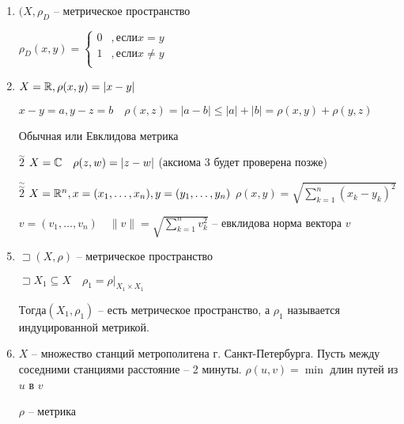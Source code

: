     \begin{example}
        \begin{enumerate}
            \item $(X, \rho_{D}$ -- метрическое пространство

                $\rho_D(x,y) = \begin{cases}
                    0&, \text{если} x=y\\
                    1&, \text{если} x\neq y\\
                \end{cases}$
            \item $X=\mathbb{R}, \rho(x,y) = |x-y|$

                $x-y = a, y-z = b\quad \rho(x,z) = |a-b|\leqslant |a| + |b| = \rho(x,y) + \rho(y,z)$

                Обычная или Евклидова метрика
            \item [$\overset{\sim }2$] $X = \mathbb{C}\quad \rho(z,w) = |z-w|$ (аксиома 3 будет проверена позже)
            \item [$\overset{\sim }{\overset{\sim }{2}}$]  $X = \mathbb{R}^n, x = (x_1, \ldots, x_{n} ), y = (y_1, \ldots, y_{n} )$ $\rho(x,y) = \sqrt{\sum_{k=1}^{n} \left( x_k-y_k \right) ^2} $

                $v = (v_1, \ldots, v_n)\quad \|v\| = \sqrt{\sum_{k=1}^{n} v_k^2} $ -- евклидова норма вектора $v$
            \item $\sqsupset (X, \rho)$ -- метрическое пространство

                $\sqsupset X_1\subseteq X\quad \rho_1 = \rho|_{X_1\times X_1}$

                $Тогда (X_1, \rho_1)$ -- есть метрическое пространство, а $\rho_1$ называется индуцированной метрикой.
            \item $X$ -- множество станций метрополитена г. Санкт-Петербурга. Пусть между соседними станциями расстояние -- 2 минуты. $\rho(u,v) = \min$ длин путей из $u$ в $v$

               $\rho$ -- метрика
        \end{enumerate}
    \end{example}

